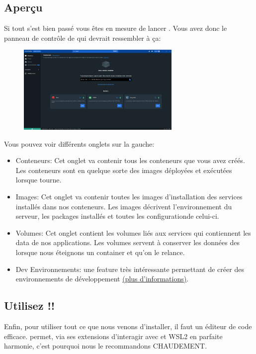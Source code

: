 \subsection[Aperçu]{Aperçu\label{sec:suite}}
    Si tout s'est bien passé vous êtes en mesure de lancer \dockerdesktop{}. Vous avez donc le panneau de contrôle de \dockerdesktop{} qui devrait ressembler à ça:\\
    \begin{figure}[h]
        \centering
        \includegraphics[width=0.7\textwidth]{Images_formation/PanelDocker.pdf}
    \end{figure}

    Vous pouvez voir différents onglets sur la gauche:

    \begin{itemize}
        \item Conteneurs: Cet onglet va contenir tous les conteneurs que vous avez créés. Les conteneurs sont en quelque sorte des images déployées et exécutées lorsque \docker{} tourne.
        \item Images: Cet onglet va contenir toutes les images d'installation des services installés dans nos conteneurs. Les images décrivent l'environnement du serveur, les packages installés et toutes les configurationde celui-ci.
        \item Volumes: Cet onglet contient les volumes liés aux services qui contiennent les data de nos applications. Les volumes servent à conserver les données des \db{} lorsque nous éteignons un container et qu'on le relance.
        \item Dev Environnements: une feature très intéressante permettant de créer des environnements de développement \footnotesize{\href{https://docs.docker.com/desktop/dev-environments/}{(plus d'informations)}}.
    \end{itemize}

\subsection[VS Code]{Utilisez \vscode!!}
    Enfin, pour utiliser tout ce que nous venons d'installer, il faut un éditeur de code efficace. \href{https://code.visualstudio.com/}{\vscode{}} permet, via ses extensions d'interagir avec \docker{} et WSL2 en parfaite harmonie, c'est pourquoi nous le recommandons CHAUDEMENT. 

